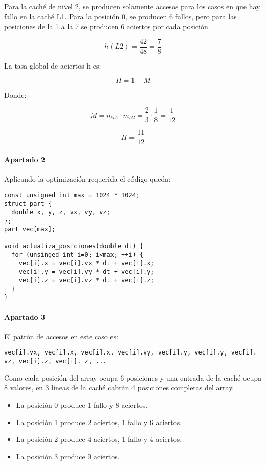 Para la caché de nivel 2, se producen solamente accesos para los casos en que
hay fallo en la caché L1. Para la posición 0, se producen 6 fallos, pero para
las posiciones de la 1 a la 7 se producen 6 aciertos por cada posición.

\[
h(L2) = 
\frac{42}{48} = 
\frac{7}{8}
\]

La tasa global de aciertos h es:

\[
H = 1 - M
\]

Donde:

\[
M = 
m_{h1} \cdot m_{h2} = 
\frac{2}{3} \cdot \frac{1}{8} = 
\frac{1}{12}
\]

\[
H = \frac{11}{12}
\]


\paragraph{Apartado 2}

Aplicando la optimización requerida el código queda:

\begin{lstlisting}
const unsigned int max = 1024 * 1024;
struct part {
  double x, y, z, vx, vy, vz;
};
part vec[max];

void actualiza_posiciones(double dt) {
  for (unsinged int i=0; i<max; ++i) {
    vec[i].x = vec[i].vx * dt + vec[i].x;
    vec[i].y = vec[i].vy * dt + vec[i].y;
    vec[i].z = vec[i].vz * dt + vec[i].z;
  }
}
\end{lstlisting}

\paragraph{Apartado 3}

El patrón de accesos en este caso es:

\begin{lstlisting}
vec[i].vx, vec[i].x, vec[i].x, vec[i].vy, vec[i].y, vec[i].y, vec[i]. vz, vec[i].z, vec[i]. z, ...
\end{lstlisting}

Como cada posición del array ocupa 6 posiciones y una entrada de la caché ocupa
8 valores, en 3 líneas de la caché cabrán 4 posiciones completas del array.

\begin{itemize}
  \item La posición 0 produce 1 fallo y 8 aciertos.
  \item La posición 1 produce 2 aciertos, 1 fallo y 6 aciertos.
  \item La posición 2 produce 4 aciertos, 1 fallo y 4 aciertos.
  \item La posición 3 produce 9 aciertos.
\end{itemize}

